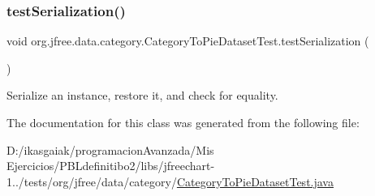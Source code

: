 \subsubsection{\texorpdfstring{test\+Serialization()}{testSerialization()}}
{\footnotesize\ttfamily void org.\+jfree.\+data.\+category.\+Category\+To\+Pie\+Dataset\+Test.\+test\+Serialization (\begin{DoxyParamCaption}{ }\end{DoxyParamCaption})}

Serialize an instance, restore it, and check for equality. 

The documentation for this class was generated from the following file\+:\begin{DoxyCompactItemize}
\item 
D\+:/ikasgaiak/programacion\+Avanzada/\+Mis Ejercicios/\+P\+B\+Ldefinitibo2/libs/jfreechart-\/1../tests/org/jfree/data/category/\mbox{\hyperlink{_category_to_pie_dataset_test_8java}{Category\+To\+Pie\+Dataset\+Test.\+java}}\end{DoxyCompactItemize}
